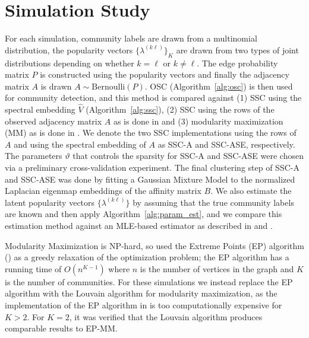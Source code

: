 \documentclass[12pt]{article}
\begin{document}
\hypertarget{simulated-examples}{%
\section{Simulation Study}\label{simulated-examples}}

For each simulation, community labels are drawn from a multinomial
distribution, the popularity vectors \(\{\lambda^{(k \ell)}\}_K\) are drawn
from two types of joint distributions depending on whether \(k =
\ell\) or $k \not = \ell$. The edge probability matrix \(P\) is constructed using the popularity
vectors and finally the adjacency matrix \(A\)
is drawn \(A \sim \mathrm{Bernoulli}(P)\). OSC (Algorithm~\ref{alg:osc}) is then used for community detection, and this
method is compared against (1) SSC using the spectral embedding $\hat{V}$
(Algorithm~\ref{alg:ssc}), (2) SSC using the rows of the
observed adjacency matrix $A$ as is done in \citet{noroozi2019estimation}
and (3) modularity maximization (MM) as is done in
\citet{307cbeb9b1be48299388437423d94bf1}. We denote the two SSC
implementations using the rows of $A$ and using the spectral embedding
of $A$ as SSC-A and SSC-ASE, respectively. The parameters \(\vartheta\)
that controls the sparsity for SSC-A and SSC-ASE were chosen via a preliminary cross-validation
experiment. The final clustering step of SSC-A and SSC-ASE was done
by fitting a Gaussian Mixture Model to the normalized Laplacian
eigenmap embeddings \citep{belkin03:_laplac} of the affinity matrix \(B\).
We also estimate the latent popularity vectors $\{\lambda^{(k \ell)}\}$
by assuming that the true community labels are known and then apply
Algorithm~\ref{alg:param_est}, and we compare this estimation method against an
MLE-based estimator as described in \citet{noroozi2019estimation} and
\citet{307cbeb9b1be48299388437423d94bf1}.

Modularity Maximization is NP-hard, so
\citet{307cbeb9b1be48299388437423d94bf1} used the Extreme Points
(EP) algorithm (\cite{le2016}) as a greedy
relaxation of the optimization problem; the EP algorithm has a running
time of $O(n^{K-1})$ where $n$ is the number of vertices in the graph
and $K$ is the number of communities.
For these simulations we instead replace the EP algorithm with the
Louvain algorithm for modularity maximization,
as the implementation of the EP algorithm in
\citet{307cbeb9b1be48299388437423d94bf1} is too computationally expensive for \(K > 2\). For \(K = 2\), it
was verified that the Louvain algorithm produces comparable results
to EP-MM.
\end{document}
